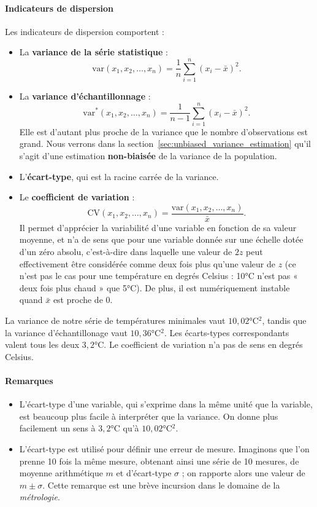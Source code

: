 \paragraph{Indicateurs de dispersion} Les indicateurs de dispersion comportent : 
\begin{itemize}
	\item La \textbf{variance de la série statistique} :
	\[ \text{var}(x_1, x_2, \dots, x_n) = \frac1n \sum_{i=1}^n (x_i - \bar x)^2.\]
	\item La \textbf{variance d'échantillonnage} :
	\[ \text{var}^*(x_1, x_2, \dots, x_n) = \frac1{n-1} \sum_{i=1}^n (x_i - \bar
	x)^2.\]
	Elle est d'autant plus proche de la variance que le
	nombre d'observations est grand. Nous verrons dans la
	section~\ref{sec:unbiased_variance_estimation} qu'il s'agit d'une estimation
	\textbf{non-biaisée} de la variance de la population.
	\item L'\textbf{écart-type}, qui est la racine carrée de la variance.
	\item Le \textbf{coefficient de variation} :
	\[ \text{CV}(x_1, x_2, \dots, x_n) = \frac{\text{var}(x_1, x_2, \dots, x_n)}{\bar
		x}.\]
	Il permet d'apprécier la variabilité d'une variable
	en fonction de sa valeur moyenne, et n'a de sens que pour une variable donnée
	sur une échelle dotée d'un zéro absolu, c'est-à-dire dans laquelle une valeur
	de $2z$ peut effectivement être considérée comme deux fois plus qu'une valeur
	de $z$ (ce n'est pas le cas pour une température en degrés Celsius :
	10\si{\celsius} n'est pas « deux fois plus chaud » que 5\si{\celsius}). De
	plus, il est numériquement instable quand $\bar x$ est proche de 0.
\end{itemize}
\pagebreak

\begin{exemple}
	La variance de notre série de températures minimales vaut $10,02 \si{\celsius^2}$,
	tandis que la variance d'échantillonage vaut $10,36 \si{\celsius^2}$. Les
	écarts-types correspondants valent tous les deux $3,2 \si{\celsius}$.  Le
	coefficient de variation n'a pas de sens en degrés Celsius.
\end{exemple}
\paragraph{Remarques}
\begin{itemize}
	\item L'écart-type d'une variable, qui s'exprime dans la même unité que la
	variable, est beaucoup plus facile à interpréter que la variance. On donne
	plus facilement un sens à $3,2 \si{\celsius}$ qu'à $10,02 \si{\celsius^2}$.
	\item L'écart-type est utilisé pour définir une erreur de mesure. Imaginons que
	l'on prenne 10 fois la même mesure, obtenant ainsi une série de 10
	mesures, de moyenne arithmétique $m$ et d'écart-type $\sigma$ ; on rapporte
	alors une valeur de $m \pm \sigma$. Cette remarque est une brève incursion
	dans le domaine de la \textit{métrologie}.
\end{itemize}

